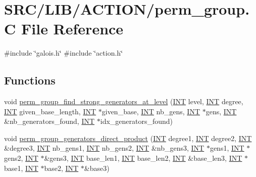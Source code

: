 \hypertarget{perm__group_8_c}{}\section{S\+R\+C/\+L\+I\+B/\+A\+C\+T\+I\+O\+N/perm\+\_\+group.C File Reference}
\label{perm__group_8_c}
{\ttfamily \#include \char`\"{}galois.\+h\char`\"{}}\newline
{\ttfamily \#include \char`\"{}action.\+h\char`\"{}}\newline
\subsection*{Functions}
\begin{DoxyCompactItemize}
\item 
void \mbox{\hyperlink{perm__group_8_c_a36a4c7f2a6d8ae4aad3de61254ca38c3}{perm\+\_\+group\+\_\+find\+\_\+strong\+\_\+generators\+\_\+at\+\_\+level}} (\mbox{\hyperlink{galois_8h_a09fddde158a3a20bd2dcadb609de11dc}{I\+NT}} level, \mbox{\hyperlink{galois_8h_a09fddde158a3a20bd2dcadb609de11dc}{I\+NT}} degree, \mbox{\hyperlink{galois_8h_a09fddde158a3a20bd2dcadb609de11dc}{I\+NT}} given\+\_\+base\+\_\+length, \mbox{\hyperlink{galois_8h_a09fddde158a3a20bd2dcadb609de11dc}{I\+NT}} $\ast$given\+\_\+base, \mbox{\hyperlink{galois_8h_a09fddde158a3a20bd2dcadb609de11dc}{I\+NT}} nb\+\_\+gens, \mbox{\hyperlink{galois_8h_a09fddde158a3a20bd2dcadb609de11dc}{I\+NT}} $\ast$gens, \mbox{\hyperlink{galois_8h_a09fddde158a3a20bd2dcadb609de11dc}{I\+NT}} \&nb\+\_\+generators\+\_\+found, \mbox{\hyperlink{galois_8h_a09fddde158a3a20bd2dcadb609de11dc}{I\+NT}} $\ast$idx\+\_\+generators\+\_\+found)
\item 
void \mbox{\hyperlink{perm__group_8_c_a9dfc946f0643db978d4d719964f1ded2}{perm\+\_\+group\+\_\+generators\+\_\+direct\+\_\+product}} (\mbox{\hyperlink{galois_8h_a09fddde158a3a20bd2dcadb609de11dc}{I\+NT}} degree1, \mbox{\hyperlink{galois_8h_a09fddde158a3a20bd2dcadb609de11dc}{I\+NT}} degree2, \mbox{\hyperlink{galois_8h_a09fddde158a3a20bd2dcadb609de11dc}{I\+NT}} \&degree3, \mbox{\hyperlink{galois_8h_a09fddde158a3a20bd2dcadb609de11dc}{I\+NT}} nb\+\_\+gens1, \mbox{\hyperlink{galois_8h_a09fddde158a3a20bd2dcadb609de11dc}{I\+NT}} nb\+\_\+gens2, \mbox{\hyperlink{galois_8h_a09fddde158a3a20bd2dcadb609de11dc}{I\+NT}} \&nb\+\_\+gens3, \mbox{\hyperlink{galois_8h_a09fddde158a3a20bd2dcadb609de11dc}{I\+NT}} $\ast$gens1, \mbox{\hyperlink{galois_8h_a09fddde158a3a20bd2dcadb609de11dc}{I\+NT}} $\ast$gens2, \mbox{\hyperlink{galois_8h_a09fddde158a3a20bd2dcadb609de11dc}{I\+NT}} $\ast$\&gens3, \mbox{\hyperlink{galois_8h_a09fddde158a3a20bd2dcadb609de11dc}{I\+NT}} base\+\_\+len1, \mbox{\hyperlink{galois_8h_a09fddde158a3a20bd2dcadb609de11dc}{I\+NT}} base\+\_\+len2, \mbox{\hyperlink{galois_8h_a09fddde158a3a20bd2dcadb609de11dc}{I\+NT}} \&base\+\_\+len3, \mbox{\hyperlink{galois_8h_a09fddde158a3a20bd2dcadb609de11dc}{I\+NT}} $\ast$base1, \mbox{\hyperlink{galois_8h_a09fddde158a3a20bd2dcadb609de11dc}{I\+NT}} $\ast$base2, \mbox{\hyperlink{galois_8h_a09fddde158a3a20bd2dcadb609de11dc}{I\+NT}} $\ast$\&base3)

\end{DoxyCompactItemize}
